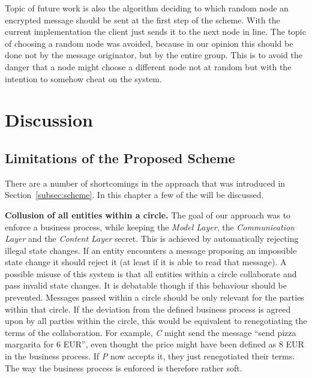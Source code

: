 \documentclass[runningheads]{llncs}
\newcommand{\comment}[1]{}
\newcommand{\ber}[1]{\textit{#1}}
\newcommand{\refsec}[1]{Section~\ref{#1}}
\renewcommand{\bigbreak}{}
\newcommand{\quotel}{``}
\newcommand{\quoter}{''}
\begin{document}
Topic of future work is also the algorithm deciding to which random node an encrypted message should be sent at the first step of the scheme. With the current implementation the client just sends it to the next node in line. The topic of choosing a random node was avoided, because in our opinion this should be done not by the message originator, but by the entire group. This is to avoid the danger that a node might choose a different node not at random but with the intention to somehow cheat on the system.


\comment{
done: 
simple implementation 
simulating a simple ring with 3 clients 
2 clients are within the same circle 
smart contract has public and is able to verify messages send from the ring

Not done: 
randomization. A client will not send the message of to a new node, rather just to the next one in line

Automatic accept/reject of messages send from node to node. User has to do that at current time.

architecture: 
Clients implemented in Python 3.6

smart contract implemented using Solidity

Application was tested using the local Ethereum application Ganache

}


\section{Discussion} \label{sec:discussion}

\subsection{Limitations of the Proposed Scheme}

There are a number of shortcomings in the approach that was introduced in \refsec{subsec:scheme}. In this chapter a few of the will be discussed.



\bigbreak
\textbf{Collusion of all entities within a circle.} The goal of our approach was to enforce a business process, while keeping the \ber{Model Layer}, the \ber{Communication Layer} and the \ber{Content Layer} secret. This is achieved by automatically rejecting illegal state changes. If an entity encounters a message proposing an impossible state change it should reject it (at least if it is able to read that message). A possible misuse of this system is that all entities within a circle collaborate and pass invalid state changes. It is debatable though if this behaviour should be prevented. Messages passed within a circle should be only relevant for the parties within that circle. If the deviation from the defined business process is agreed upon by all parties within the circle, this would be equivalent to renegotiating the terms of the collaboration. For example, \ber{C} might send the message \quotel send pizza margarita for 6 EUR\quoter , even thought the price might have been defined as 8 EUR in the business process. If \ber{P} now accepts it, they just renegotiated their terms. The way the business process is enforced is therefore rather soft. 
\end{document}
